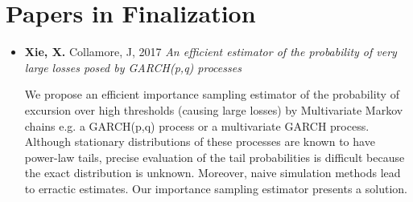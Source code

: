 \documentclass[a4paper]{twentysecondcv} %
\begin{document}
\pagebreak
\makeprofile %

\section{Papers in Finalization}
\begin{itemize}
\item {\bf Xie, X.} Collamore, J, 2017
  {\it An efficient estimator of the probability of very large losses posed by
    GARCH(p,q) processes}

  {\small
    We propose an efficient importance sampling estimator of the
    probability of excursion over high thresholds (causing large
    losses) by Multivariate Markov chains e.g. a GARCH(p,q) process or
    a multivariate GARCH process.
    Although stationary distributions of these processes are known
    to have power-law tails, precise evaluation of the tail
    probabilities is difficult because the exact distribution is
    unknown. Moreover, naive simulation methods lead to erractic
    estimates. Our importance sampling estimator presents a solution.
  }
\end{itemize}






\end{document}
